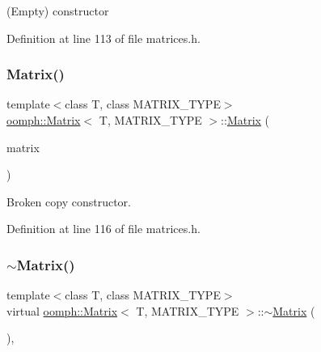(Empty) constructor 



Definition at line 113 of file matrices.\+h.

\mbox{\label{classoomph_1_1Matrix_af6fb4df80b38414670a17080ca25aa4b}} 
\subsubsection{\texorpdfstring{Matrix()}{Matrix()}\hspace{0.1cm}{\footnotesize\ttfamily [2/2]}}
{\footnotesize\ttfamily template$<$class T, class M\+A\+T\+R\+I\+X\+\_\+\+T\+Y\+PE$>$ \\
\hyperlink{classoomph_1_1Matrix}{oomph\+::\+Matrix}$<$ T, M\+A\+T\+R\+I\+X\+\_\+\+T\+Y\+PE $>$\+::\hyperlink{classoomph_1_1Matrix}{Matrix} (\begin{DoxyParamCaption}\item[{const \hyperlink{classoomph_1_1Matrix}{Matrix}$<$ T, M\+A\+T\+R\+I\+X\+\_\+\+T\+Y\+PE $>$ \&}]{matrix }\end{DoxyParamCaption})\hspace{0.3cm}{\ttfamily [inline]}}



Broken copy constructor. 



Definition at line 116 of file matrices.\+h.

\mbox{\label{classoomph_1_1Matrix_a3bc2eeb0940268de5252a9234d126f11}} 
\subsubsection{\texorpdfstring{$\sim$\+Matrix()}{~Matrix()}}
{\footnotesize\ttfamily template$<$class T, class M\+A\+T\+R\+I\+X\+\_\+\+T\+Y\+PE$>$ \\
virtual \hyperlink{classoomph_1_1Matrix}{oomph\+::\+Matrix}$<$ T, M\+A\+T\+R\+I\+X\+\_\+\+T\+Y\+PE $>$\+::$\sim$\hyperlink{classoomph_1_1Matrix}{Matrix} (\begin{DoxyParamCaption}{ }\end{DoxyParamCaption})\hspace{0.3cm}{\ttfamily [inline]}, {\ttfamily [virtual]}}



